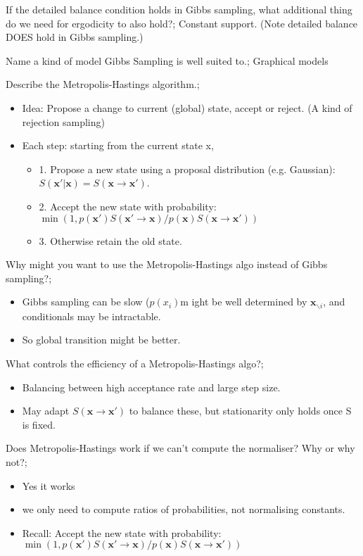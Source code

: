 \documentclass{article}
\begin{document}
If the detailed balance condition holds in Gibbs sampling, what additional thing do we need for ergodicity to also hold?; Constant support. (Note detailed balance DOES hold in Gibbs sampling.)

Name a kind of model Gibbs Sampling is well suited to.; Graphical models

Describe the Metropolis-Hastings algorithm.; \begin{itemize} \item Idea: Propose a change to current (global) state, accept or reject. (A kind of rejection sampling) \item Each step: starting from the current state x, \begin{itemize} \item 1. Propose a new state  using a proposal distribution (e.g. Gaussian): $S(\mathbf{x'|x}) = S(\mathbf{x\rightarrow x'})$. \item 2. Accept the new state with probability: $\min (1, p(\mathbf{x'})S(\mathbf{x'\rightarrow x})/p(\mathbf{x})S(\mathbf{x}\rightarrow \mathbf{x'}))$ \item 3. Otherwise retain the old state. \end{itemize} \end{itemize}

Why might you want to use the Metropolis-Hastings algo instead of Gibbs sampling?; \begin{itemize} \item Gibbs sampling can be slow ($p(x_i)$m ight be well determined by $\mathbf{x}_{\backslash i}$, and conditionals may be intractable. \item So global transition might be better. \end{itemize}

What controls the efficiency of a Metropolis-Hastings algo?; \begin{itemize} \item Balancing between high acceptance rate and large step size. \item May adapt $S(\mathbf{x\rightarrow x'})$ to balance these, but stationarity only holds once S is fixed. \end{itemize}

Does Metropolis-Hastings work if we can't compute the normaliser? Why or why not?; \begin{itemize} \item Yes it works \item we only need to compute ratios of probabilities, not normalising constants. \item Recall: Accept the new state with probability: $\min (1, p(\mathbf{x'})S(\mathbf{x'\rightarrow x})/p(\mathbf{x})S(\mathbf{x}\rightarrow \mathbf{x'}))$ \end{itemize}
\end{document}
